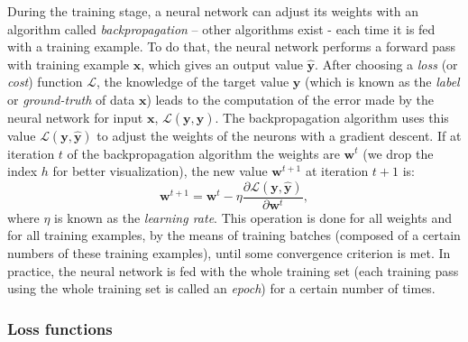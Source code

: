 During the training stage, a neural network can adjust its weights with an algorithm called \textit{backpropagation} -- other algorithms exist - each time it is fed with a training example. To do that, the neural network performs a forward pass with training example $\mathbf{x}$, which gives an output value $\hat{\mathbf{y}}$. After choosing a \textit{loss} (or \textit{cost}) function $\mathcal{L}$, the knowledge of the target value $\mathbf{y}$ (which is known as the \textit{label} or \textit{ground-truth} of data $\mathbf{x}$) leads to the computation of the error made by the neural network for input $\mathbf{x}$, $\mathcal{L}(\mathbf{y},\hat{\mathbf{y}})$. The backpropagation algorithm uses this value $\mathcal{L}(\mathbf{y},\hat{\mathbf{y}})$ to adjust the weights of the neurons with a gradient descent. If at iteration $t$ of the backpropagation algorithm the weights are $\mathbf{w}^t$ (we drop the index $h$ for better visualization), the new value $\mathbf{w}^{t+1}$ at iteration $t+1$ is:
\begin{equation}
    \mathbf{w}^{t+1} = \mathbf{w}^{t} - \eta \frac{\partial \mathcal{L}(\mathbf{y}, \hat{\mathbf{y}})}{\partial \mathbf{w}^{t}},
\end{equation}
where $\eta$ is known as the \textit{learning rate}. This operation is done for all weights and for all training examples, by the means of training batches (composed of a certain numbers of these training examples), until some convergence criterion is met. In practice, the neural network is fed with the whole training set (each training pass using the whole training set is called an \textit{epoch}) for a certain number of times.

\subsubsection{Loss functions}

